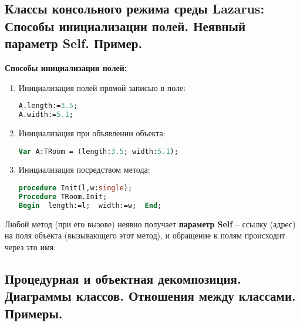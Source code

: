
\newpage\subsection{Классы консольного режима  среды  Lazarus: Способы инициализации полей. Неявный параметр Self. Пример. }

\begin{myquote}
            
\end{myquote}

{\bf {Способы инициализация полей:}}
\begin{enumerate}
\item Инициализация полей прямой записью в поле:

\begin{lstlisting}[language=Pascal]
A.length:=3.5;
A.width:=5.1;
\end{lstlisting}

\item Инициализация при объявлении объекта: 
\begin{lstlisting}[language=Pascal]
Var A:TRoom = (length:3.5; width:5.1);
\end{lstlisting}

\item Инициализация посредством метода:
\begin{lstlisting}[language=Pascal]
procedure Init(l,w:single);
Procedure TRoom.Init;
Begin  length:=l;  width:=w;  End;
\end{lstlisting}

\end{enumerate}

Любой метод (при его вызове) неявно получает {\bf{параметр Self}} – ссылку (адрес) на 
поля объекта (вызывающего этот метод), и обращение к полям происходит через это имя.



\newpage\subsection{Процедурная и объектная декомпозиция. Диаграммы классов. Отношения между классами. Примеры. }

\begin{myquote}
            
\end{myquote}


